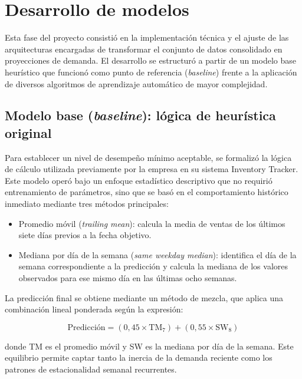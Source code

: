 \section{Desarrollo de modelos}

Esta fase del proyecto consistió en la implementación técnica y el ajuste de las arquitecturas encargadas de transformar el conjunto de datos consolidado en proyecciones de demanda. El desarrollo se estructuró a partir de un modelo base heurístico que funcionó como punto de referencia (\textit{baseline}) frente a la aplicación de diversos algoritmos de aprendizaje automático de mayor complejidad.



\subsection{Modelo base (\textit{baseline}): lógica de heurística original}

Para establecer un nivel de desempeño mínimo aceptable, se formalizó la lógica de cálculo utilizada previamente por la empresa en su sistema Inventory Tracker. Este modelo operó bajo un enfoque estadístico descriptivo que no requirió entrenamiento de parámetros, sino que se basó en el comportamiento histórico inmediato mediante tres métodos principales:

\begin{itemize}

	\item Promedio móvil (\textit{trailing mean}): calcula la media de ventas de los últimos siete días previos a la fecha objetivo. 
	\item Mediana por día de la semana (\textit{same weekday median}): identifica el día de la semana correspondiente a la predicción y calcula la mediana de los valores observados para ese mismo día en las últimas ocho semanas.

\end{itemize}

La predicción final se obtiene mediante un método de mezcla, que aplica una combinación lineal ponderada según la expresión: 

\begin{equation}
    \text{Predicción} = (0{,}45 \times \text{TM}_7) + (0{,}55 \times \text{SW}_8)
\end{equation}

donde TM es el promedio móvil y SW es la mediana por día de la semana.
Este equilibrio permite captar tanto la inercia de la demanda reciente como los patrones de estacionalidad semanal recurrentes.

